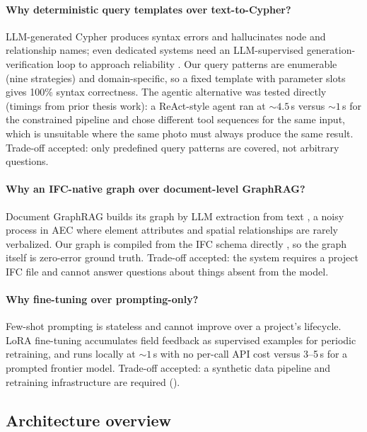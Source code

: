 \paragraph{Why deterministic query templates over text-to-Cypher?} LLM-generated Cypher produces
syntax errors and hallucinates node and relationship names; even dedicated systems need an
LLM-supervised generation-verification loop to approach reliability
\citep{tiwari2024autocypher, gusarov2025graphrag}. Our query patterns are enumerable (nine strategies)
and domain-specific, so a fixed template with parameter slots gives 100\% syntax correctness. The
agentic alternative was tested directly (timings from prior thesis work): a ReAct-style agent ran at
${\sim}4.5$\,s versus ${\sim}1$\,s for the constrained pipeline and chose different tool sequences for
the same input, which is unsuitable where the same photo must always produce the same result. Trade-off accepted: only predefined query
patterns are covered, not arbitrary questions.

\paragraph{Why an IFC-native graph over document-level GraphRAG?} Document GraphRAG builds its graph
by LLM extraction from text \citep{edge2024graphrag}, a noisy process in AEC where element attributes and
spatial relationships are rarely verbalized. Our graph is compiled from the IFC schema directly
\citep{zhu2023ifcgraph, buildingsmart2024ifc4x3}, so the graph itself is zero-error ground truth.
Trade-off accepted: the system requires a project IFC file and cannot answer questions about things
absent from the model.

\paragraph{Why fine-tuning over prompting-only?} Few-shot prompting is stateless and cannot improve
over a project's lifecycle. LoRA fine-tuning accumulates field feedback as supervised examples for
periodic retraining, and runs locally at ${\sim}1$\,s with no per-call API cost versus 3--5\,s for a
prompted frontier model. Trade-off accepted: a synthetic data pipeline and retraining infrastructure
are required ().

\subsection{Architecture overview}
\label{sec:arch}

